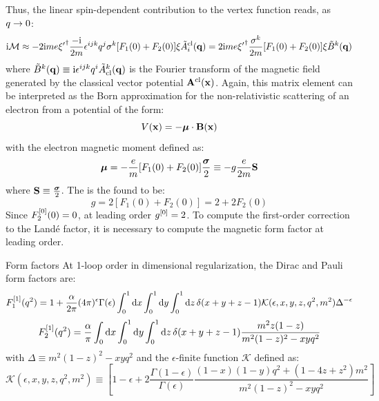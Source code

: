 Thus, the linear spin-dependent contribution to the vertex function reads, as $ q \rightarrow 0 $:
\begin{equation*}
  \mathrm{i} \mathcal{M} \approx -2\mathrm{i} me {\xi'}^\dagger \frac{-\mathrm{i}}{2m} \epsilon^{ijk} q^j \sigma^k [F_1(0) + F_2(0)] \xi \tilde{A}^\text{cl}_i(\mathbf{q}) = 2\mathrm{i} me {\xi'}^\dagger \frac{\sigma^k}{2m} [F_1(0) + F_2(0)] \xi \tilde{B}^k(\mathbf{q})
\end{equation*}
where $ \tilde{B}^k(\mathbf{q}) \equiv \mathrm{i} \epsilon^{ijk} q^i \tilde{A}_\text{cl}^k(\mathbf{q}) $ is the Fourier transform of the magnetic field generated by the classical vector potential $ \mathbf{A}^\text{cl}(\mathbf{x}) $. Again, this matrix element can be interpreted as the Born approximation for the non-relativistic scattering of an electron from a potential of the form:
\begin{equation}
  V(\mathbf{x}) = - \boldsymbol{\mu} \cdot \mathbf{B}(\mathbf{x})
\end{equation}
with the electron magnetic moment defined as:
\begin{equation}
  \boldsymbol{\mu} = - \frac{e}{m} [F_1(0) + F_2(0)] \frac{\boldsymbol{\sigma}}{2} \equiv - g \frac{e}{2m} \mathbf{S}
\end{equation}
where $ \mathbf{S} \equiv \frac{\boldsymbol{\sigma}}{2} $. The  is the found to be:
\begin{equation}
  g = 2 [F_1(0) + F_2(0)] = 2 + 2 F_2(0)
\end{equation}
Since $ F_2^{[0]}(0) = 0 $, at leading order $ g^{[0]} = 2 $. To compute the first-order correction to the Landé factor, it is necessary to compute the magnetic form factor at leading order.

\begin{proposition}{Form factors}{}
  At 1-loop order in dimensional regularization, the Dirac and Pauli form factors are:
  \begin{equation}
    F_1^{[1]}(q^2) = 1 + \frac{\alpha}{2\pi} (4\pi)^\epsilon \Gamma(\epsilon) \int_0^1 \mathrm{d} x \int_0^1 \mathrm{d} y \int_0^1 \mathrm{d} z \, \delta(x + y + z - 1) \mathcal{K}(\epsilon,x,y,z,q^2,m^2) \Delta^{-\epsilon}
  \end{equation}
  \begin{equation}
    F_2^{[1]}(q^2) = \frac{\alpha}{\pi} \int_0 \mathrm{d} x \int_0^1 \mathrm{d} y \int_0^1 \mathrm{d} z \, \delta(x + y + z - 1) \frac{m^2 z (1 - z)}{m^2 (1 - z)^2 - xy q^2}
  \end{equation}
  with $ \Delta \equiv m^2 (1 - z)^2 - xy q^2 $ and the $ \epsilon $-finite function $ \mathcal{K} $ defined as:
  \begin{equation}
    \mathcal{K}(\epsilon,x,y,z,q^2,m^2) \equiv \left[ 1 - \epsilon + 2 \frac{\Gamma(1 - \epsilon)}{\Gamma(\epsilon)} \frac{(1-x)(1-y) q^2 + (1 - 4z + z^2) m^2}{m^2 (1-z)^2 - xy q^2} \right]
  \end{equation}
\end{proposition}

